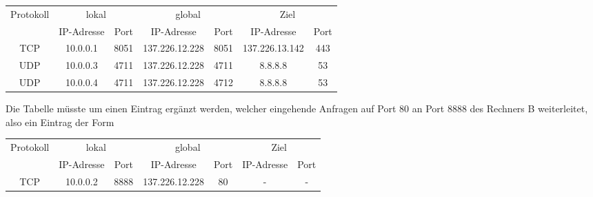 \documentclass{../exercisesheet}
\begin{document}
\begin{exercise}{2}
\begin{subexercise}
\begin{center}
\begin{tabular}{c|cc|cc|cc}
\multirow{2}{*}{Protokoll} & \multicolumn{2}{c}{lokal} & \multicolumn{2}{c}{global} & \multicolumn{2}{c}{Ziel} \\
 & IP-Adresse & Port & IP-Adresse & Port & IP-Adresse & Port \\
\hline
TCP & 10.0.0.1 & 8051 & 137.226.12.228 & 8051 & 137.226.13.142 & 443 \\
UDP & 10.0.0.3 & 4711 & 137.226.12.228 & 4711 & 8.8.8.8 & 53 \\
UDP & 10.0.0.4 & 4711 & 137.226.12.228 & 4712 & 8.8.8.8 & 53 \\
\end{tabular}
\end{center}
\end{subexercise}
\begin{subexercise}
Die Tabelle müsste um einen Eintrag ergänzt werden, welcher eingehende Anfragen auf Port 80 an Port 8888 des Rechners B weiterleitet, also ein Eintrag der Form\\
\begin{center}
\begin{tabular}{c|cc|cc|cc}
\multirow{2}{*}{Protokoll} & \multicolumn{2}{c}{lokal} & \multicolumn{2}{c}{global} & \multicolumn{2}{c}{Ziel} \\
 & IP-Adresse & Port & IP-Adresse & Port & IP-Adresse & Port \\
\hline
TCP & 10.0.0.2 & 8888 & 137.226.12.228 & 80 & - & - \\
\end{tabular}
\end{center}
\end{subexercise}
\end{exercise}
\end{document}
